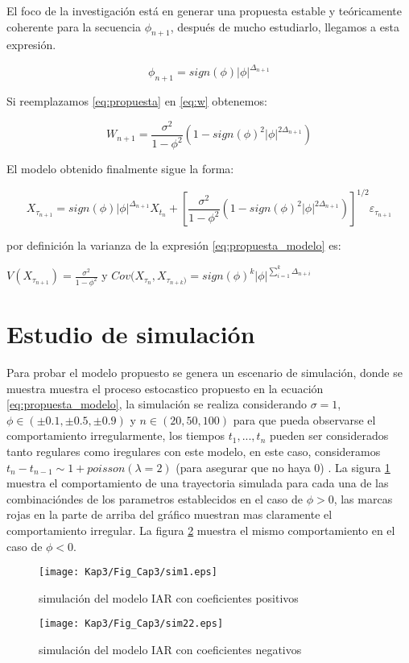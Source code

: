 El foco de la investigación está en generar una propuesta estable y teóricamente coherente para la secuencia $\phi_{n+1}$, después de mucho estudiarlo, llegamos a esta expresión.

\begin{equation}
\phi_{n+1} = sign(\phi)|\phi|^{\Delta_{n+1}}
\label{eq:propuesta}
\end{equation}

Si reemplazamos \ref{eq:propuesta} en \ref{eq:w} obtenemos:

\begin{equation}
W_{n+1} = \frac{\sigma^2}{1-\phi^2} \left(1-sign(\phi)^2 |\phi|^{2\Delta_{n+1}}\right)
\label{eq:w}
\end{equation}

El modelo obtenido finalmente sigue la forma:

\begin{equation}
X_{\tau_{n+1}} = sign(\phi)|\phi|^{\Delta_{n+1}} X_{t_n} + \left[\frac{\sigma^2}{1-\phi^2} \left(1-sign(\phi)^2 |\phi|^{2\Delta_{n+1}}\right)\right]^{1/2} \varepsilon_{\tau_{n+1}}
\label{eq:propuesta_modelo}
\end{equation}
 
por definición la varianza de la expresión \ref{eq:propuesta_modelo} es:

 $V(X_{\tau_{n+1}}) =  \frac{\sigma^2}{1-\phi^2}$ y $Cov(X_{\tau_n}, X_{\tau_{n+k})} = sign(\phi)^k|\phi|^{\sum_{i=1}^{k}\Delta_{n+i}}$


\section{Estudio de simulación}
Para probar el modelo propuesto se genera un escenario de simulación, donde se muestra muestra el proceso estocastico propuesto
en la ecuación \ref{eq:propuesta_modelo}, la simulación se realiza considerando $\sigma = 1$, $\phi \in (\pm 0.1 ,\pm 0.5,\pm 0.9)$ y $n \in (20, 50, 100)$ para que pueda
observarse el comportamiento irregularmente, los tiempos $t_1 , ... , t_n$ pueden ser considerados tanto regulares como iregulares con este modelo, en este caso, consideramos
$t_n - t_{n-1} \sim 1 + poisson(\lambda = 2)$ (para asegurar que no haya 0) . La sigura \ref{fig:sim1} muestra el comportamiento
de una trayectoria simulada para cada una de las combinacióndes de los parametros establecidos en el caso de $\phi > 0$, las marcas rojas en la parte de arriba del gráfico
muestran mas claramente el comportamiento irregular. La figura \ref{fig:sim2} muestra el mismo comportamiento en el caso de $\phi < 0$.
\begin{figure}[h]
    \texttt{[image: Kap3/Fig\_Cap3/sim1.eps]}
    \caption{simulación del modelo IAR con coeficientes positivos}
    \label{fig:sim1}
\end{figure}


\begin{figure}[h]
    \texttt{[image: Kap3/Fig\_Cap3/sim22.eps]}
    \caption{simulación del modelo IAR con coeficientes negativos}
    \label{fig:sim2}
\end{figure}